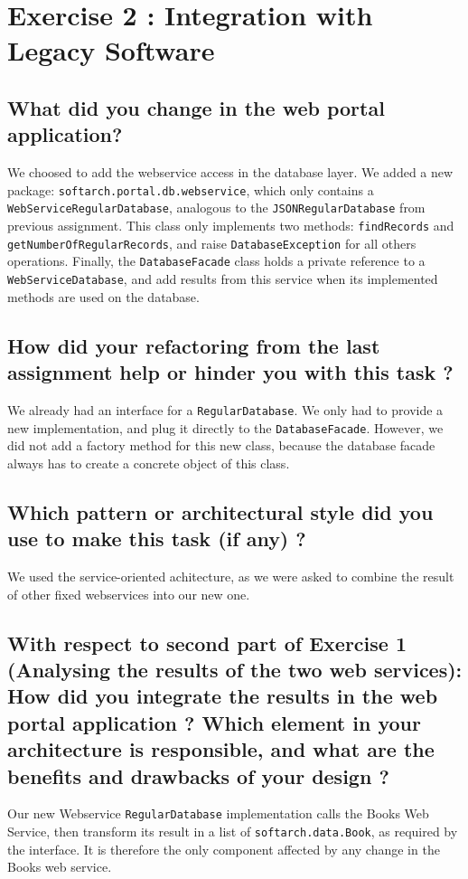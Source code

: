 \section{Exercise 2 : Integration with Legacy Software}
\subsection{What did you change in the web portal application?}
We choosed to add the webservice access in the database layer. We added a new package: \texttt{softarch.portal.db.webservice}, which only contains a \texttt{WebServiceRegularDatabase}, analogous to the \texttt{JSONRegularDatabase} from previous assignment. This class only implements two methods: \texttt{findRecords} and \texttt{getNumberOfRegularRecords}, and raise \texttt{DatabaseException} for all others operations. Finally, the \texttt{DatabaseFacade} class holds a private reference to a \texttt{WebServiceDatabase}, and add results from this service when its implemented methods are used on the database.

\subsection{How did your refactoring from the last assignment help or hinder you with this task ?}
We already had an interface for a \texttt{RegularDatabase}. We only had to provide a new implementation, and plug it directly to the \texttt{DatabaseFacade}. However, we did not add a factory method for this new class, because the database facade always has to create a concrete object of this class.

\subsection{Which pattern or architectural style did you use to make this task (if any) ?}
We used the service-oriented achitecture, as we were asked to combine the result of other fixed webservices into our new one.

\subsection{With respect to second part of Exercise 1 (Analysing the results of the two web services): How did you integrate the results in the web portal application ?
Which element in your architecture is responsible, and what are the benefits and drawbacks of your design ?}
Our new Webservice \texttt{RegularDatabase} implementation calls the Books Web Service, then transform its result in a list of \texttt{softarch.data.Book}, as required by the interface. It is therefore the only component affected by any change in the Books web service.

